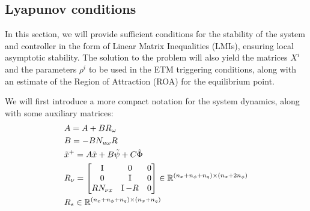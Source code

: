 \documentclass{ifacconf}
\theoremstyle{plain}
\begin{document}
\subsection{Lyapunov conditions}
In this section, we will provide sufficient conditions for the stability of the system and controller in the form of Linear Matrix Inequalities (LMIs), ensuring local asymptotic stability. The solution to the problem will also yield the matrices $X^i$ and the parameters $\rho^i$ to be used in the ETM triggering conditions, along with an estimate of the Region of Attraction (ROA) for the equilibrium point.

We will first introduce a more compact notation for the system dynamics, along with some auxiliary matrices:
\begin{equation}\label{eqn:auxiliary}
\begin{aligned}
    &\relax{A} = A + B R_{\omega}\\
    &\relax{B} = -B N_{u \omega} R\\
    &\tilde{x}^+ = \relax{A}\tilde{x} + \relax{B}\tilde{\psi} + C \tilde{\Phi}\\
&R_{\nu} = \left[\begin{matrix}
  \operatorname{I} & 0 & 0 \\
  0 & \operatorname{I} & 0 \\
  R N_{\nu x} & \operatorname{I} - R & 0\\
\end{matrix}\right] \in {\mathbb{R}}^{(n_x + n_{\phi} + n_q) \times (n_x + 2 n_{\phi})}\\
&R_s \in {\mathbb{R}}^{(n_x + n_{\phi} + n_q) \times (n_x + n_q)}
\end{aligned}
\end{equation}
\end{document}
